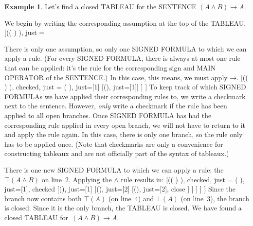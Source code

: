 \documentclass[10pt,a4paper]{article}
\newcommand*{\olup}[1]{\MakeUppercase{#1}}
\theoremstyle{plain}
\theoremstyle{definition}
\newtheorem{ex}[thm]{Example}
\theoremstyle{remark}
\newenvironment{oltableau}{}{}
\providecommand{\lif}{\mathbin{\rightarrow}}
\providecommand{\sFmla}[2]{#1(#2)}
\providecommand{\formula}{\relax}
\providecommand{\True}{\top}
\providecommand{\False}{\bot}
\providecommand{\TAss}[1]{}
\providecommand{\TRule}[1]{}
\providecommand{\formula}[1]{#1}
\begin{document}
\begin{ex}
Let's find a closed \olup{tableau} for the \olup{sentence} $(A \land B) \lif A$.

We begin by writing the corresponding assumption at the top of the
\olup{tableau}.
\begin{oltableau}
  [\sFmla{\False}{(\formula{A} \land \formula{B}) \lif \formula{A}},
    just = \TAss]
\end{oltableau}

There is only one assumption, so only one \olup{signed formula} to which
we can apply a rule. (For every \olup{signed formula}, there is always at
most one rule that can be applied: it's the rule for the corresponding
sign and \olup{main operator} of the \olup{sentence}.) In this case, this
means, we must apply $\TRule{\False}{\lif}$.
\begin{oltableau}
  [\sFmla{\False}{(\formula{A} \land \formula{B}) \lif \formula{A}},
    checked, just = \TAss
    [\sFmla{\True}{\formula{A} \land \formula{B}},
      just={\TRule{\False}{\lif}[1]}
      [\sFmla{\False}{\formula{A}}, just={\TRule{\False}{\lif}[1]}]
    ]
  ]
\end{oltableau}
To keep track of which \olup{signed formula}s we have applied their
corresponding rules to, we write a checkmark next to the
sentence. However, \emph{only} write a checkmark if the rule has been
applied to all open branches. Once \olup{signed formula} has had the
corresponding rule applied in every open branch, we will not have to
return to it and apply the rule again. In this case, there is only one
branch, so the rule only has to be applied once. (Note that checkmarks
are only a convenience for constructing tableaux and are not
officially part of the syntax of tableaux.)

There is one new \olup{signed formula} to which we can apply a rule: the
$\sFmla{\True}{A \land B}$ on line~$2$. Applying the
$\TRule{\True}{\land}$ rule results in:
\begin{oltableau}
  [\sFmla{\False}{(\formula{A} \land \formula{B}) \lif \formula{A}},
    checked, just = \TAss
    [\sFmla{\True}{\formula{A} \land \formula{B}},
      just={\TRule{\False}{\lif}[1]}, checked
      [\sFmla{\False}{\formula{A}}, just={\TRule{\False}{\lif}[1]}
        [\sFmla{\True}{\formula{A}}, just={\TRule{\True}{\land}[2]}
          [\sFmla{\True}{\formula{B}}, just={\TRule{\True}{\land}[2]}, close
          ]
        ]
      ]
    ]
  ]
\end{oltableau}
Since the branch now contains both $\sFmla{\True}{A}$ (on line~$4$)
and $\sFmla{\False}{A}$ (on line~$3$), the branch is closed. Since it
is the only branch, the \olup{tableau} is closed. We have found
a closed \olup{tableau} for~$(A \land B) \lif A$.
\end{ex}
\end{document}
